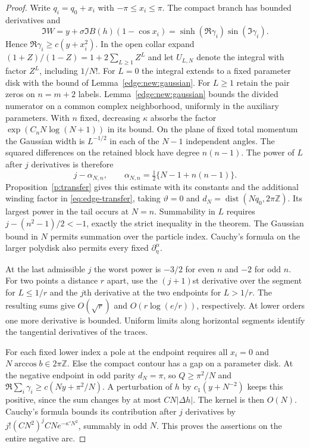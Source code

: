 \documentclass[11pt]{article}
\numberwithin{equation}{section}
\theoremstyle{definition}
\newcommand{\Z}{\mathbb Z}
\DeclareMathOperator{\dist}{dist}
\begin{document}
\begin{proof}
Write $q_i=q_0+x_i$ with $-\pi\le x_i\le\pi$. The compact branch
has bounded derivatives and
\[
 \Im W=y+\sigma\Im B(h)(1-\cos x_i)
       =\sinh(\Re\gamma_i)\sin(\Im\gamma_i).
\]
Hence $\Re\gamma_i\ge c(y+x_i^2)$. In the open collar expand
$(1+Z)/(1-Z)=1+2\sum_{L\ge1} Z^L$ and let $U_{L,N}$
denote the integral with factor $Z^L$, including $1/N!$.
For $L=0$ the integral extends to a fixed parameter disk with
the bound of Lemma~\ref{edge:new:gaussian}.
For $L\ge1$ retain the pair zeros on $n=m+2$ labels.
Lemma~\ref{edge:new:gaussian} bounds the divided numerator on a common
complex neighborhood, uniformly in the auxiliary parameters. With $n$
fixed, decreasing $\kappa$ absorbs the factor $\exp(C_n N\log(N+1))$
in its bound.
On the plane of fixed total momentum the Gaussian width is
$L^{-1/2}$ in each of the $N-1$ independent angles. The squared
differences on the retained block have degree $n(n-1)$. The power
of $L$ after $j$ derivatives is therefore
\[
    j-\alpha_{N,n},\qquad
    \alpha_{N,n}=\tfrac12\{N-1+n(n-1)\}.
\]
Proposition~\ref{p:transfer} gives this estimate with its constants
and the additional winding factor in \eqref{eq:edge-transfer}, taking
$\vartheta=0$ and $d_N=\dist(Nq_0,2\pi\Z)$. Its largest power in the
tail occurs at $N=n$. Summability in $L$ requires
$j-(n^2-1)/2<-1$, exactly the strict inequality in the theorem.
The Gaussian bound in $N$ permits summation over the particle index.
Cauchy's formula on the larger polydisk also permits every fixed
$\partial_\eta^\alpha$.

At the last admissible $j$ the worst power is $-3/2$ for even $n$
and $-2$ for odd $n$. For two points a distance $r$ apart, use the
$(j+1)$st derivative over the segment for $L\le1/r$ and the $j$th
derivative at the two endpoints for $L>1/r$. The resulting sums give
$O(\sqrt r)$ and $O(r\log(e/r))$, respectively. At lower orders one
more derivative is bounded. Uniform limits along horizontal segments
identify the tangential derivatives of the traces.

For each fixed lower index a pole at the endpoint requires all
$x_i=0$ and $N\arccos b\in2\pi\Z$. Else the compact contour has a
gap on a parameter disk. At the negative endpoint in odd parity
$d_N=\pi$, so $Q\ge\pi^2/N$ and
$\Re\sum_i\gamma_i\ge c(Ny+\pi^2/N)$.
A perturbation of $h$ by $c_1(y+N^{-2})$ keeps this positive,
since the sum changes by at most $CN|\Delta h|$. The kernel is then
$O(N)$. Cauchy's formula bounds its contribution after $j$ derivatives
by $j!(CN^2)^j CN e^{-\kappa'N^2}$, summably in odd $N$.
This proves the assertions on the entire negative arc.
\end{proof}
\end{document}

